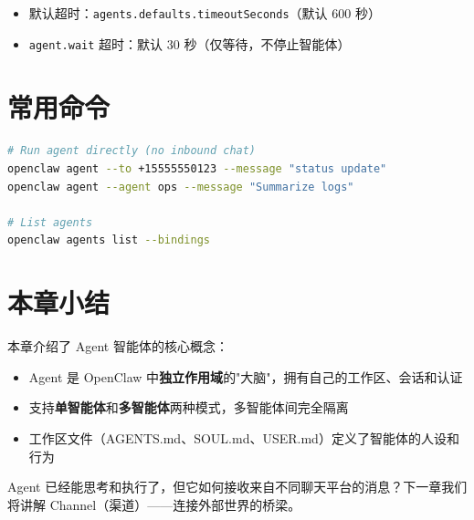 \begin{itemize}
  \item 默认超时：\texttt{agents.defaults.timeoutSeconds}（默认 600 秒）
  \item \texttt{agent.wait} 超时：默认 30 秒（仅等待，不停止智能体）
\end{itemize}

\section{常用命令}

\begin{lstlisting}[language=bash]
# Run agent directly (no inbound chat)
openclaw agent --to +15555550123 --message "status update"
openclaw agent --agent ops --message "Summarize logs"

# List agents
openclaw agents list --bindings
\end{lstlisting}

\section{本章小结}

本章介绍了 Agent 智能体的核心概念：

\begin{itemize}
  \item Agent 是 OpenClaw 中\textbf{独立作用域}的"大脑"，拥有自己的工作区、会话和认证
  \item 支持\textbf{单智能体}和\textbf{多智能体}两种模式，多智能体间完全隔离
  \item 工作区文件（AGENTS.md、SOUL.md、USER.md）定义了智能体的人设和行为
\end{itemize}

\noindent Agent 已经能思考和执行了，但它如何接收来自不同聊天平台的消息？下一章我们将讲解 Channel（渠道）——连接外部世界的桥梁。
